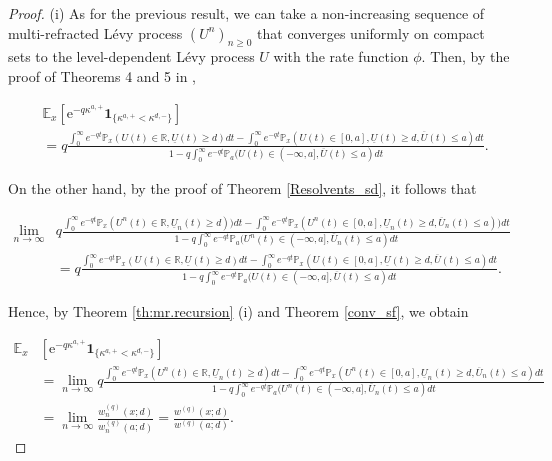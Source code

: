 \documentclass[12pt,reqno]{amsart}
\theoremstyle{definition}
\theoremstyle{remark}
\newcommand{\e}{\mathbb{E}}
\newcommand{\ind}{\mathbf{1}}
\newcommand{\wq}{w^{(q)}}
\begin{document}
\begin{proof}
(i) As for the previous result, we can take a non-increasing sequence of multi-refracted L\'evy process $(U^n)_{n\geq 0}$ 
that converges uniformly on compact sets to the level-dependent L\'evy process $U$ with the rate function $\phi$. Then, by the proof of Theorems 4 and 5 in \cite{kyprianouloeffen2010},

\begin{align*}
&\e_x \left[ \mathrm{e}^{-q \kappa^{a,+}} \ind_{\{\kappa^{a,+}< \kappa^{d,-}\}} \right]\\&=
q\frac{\int_0^{\infty} e^{-qt}\mathbb{P}_x(U(t)\in\mathbb{R},\underline{U}(t)\geq d)dt-\int_0^{\infty} e^{-qt}
	\mathbb{P}_x(U(t)\in[0,a],\underline{U}(t)\geq d,\overline{U}(t)\leq a)dt}
{1-q\int_0^{\infty} e^{-qt}\mathbb{P}_a(U(t)\in(-\infty,a],\overline{U}(t)\leq a)dt}.
\end{align*}	
	
On the other hand, by the proof of Theorem \ref{Resolvents_sd}, it follows that

\begin{align*}
\lim_{n\to\infty}&q\frac{\int_0^{\infty} e^{-qt}\mathbb{P}_x(U^n(t)\in\mathbb{R},\underline{U}_n(t)\geq d))dt-\int_0^{\infty} e^{-qt}\mathbb{P}_x(U^n(t)\in[0,a],\underline{U}_n(t)\geq d,
	\overline{U}_n(t)\leq a))dt}{1-q\int_0^{\infty} e^{-qt}\mathbb{P}_a(U^n(t)\in(-\infty,a],\overline{U}_n(t)\leq a)dt}\\
&=q\frac{\int_0^{\infty} e^{-qt}\mathbb{P}_x(U(t)\in\mathbb{R},\underline{U}(t)\geq d)dt-\int_0^{\infty} e^{-qt}\mathbb{P}_x(U(t)\in[0,a],\underline{U}(t)\geq d,\overline{U}(t)\leq a)dt}
{1-q\int_0^{\infty} e^{-qt}\mathbb{P}_a(U(t)\in(-\infty,a],\overline{U}(t)\leq a)dt}.
\end{align*}	
	
Hence, by Theorem \ref{th:mr.recursion} (i) and Theorem \ref{conv_sf}, we obtain

\begin{align*}
\e_x &\left[ \mathrm{e}^{-q \kappa^{a,+}} \ind_{\{\kappa^{a,+}< \kappa^{d,-}\}} \right]\\
&=\lim_{n\to\infty}q\frac{\int_0^{\infty} e^{-qt}\mathbb{P}_x(U^n(t)\in\mathbb{R},\underline{U}_n(t)\geq d)dt-\int_0^{\infty} e^{-qt}\mathbb{P}_x(U^n(t)\in[0,a],
	\underline{U}_n(t)\geq d,\overline{U}_n(t)\leq a)dt}{1-q\int_0^{\infty} e^{-qt}\mathbb{P}_a(U^n(t)\in(-\infty,a],\overline{U}_n(t)\leq a)dt}\\
&=\lim_{n\to\infty}\frac{w_n^{(q)}(x;d)}{w_n^{(q)}(a;d)}=\frac{\wq(x;d)}{\wq(a;d)}.
\end{align*}	
	

\end{proof}
\end{document}
